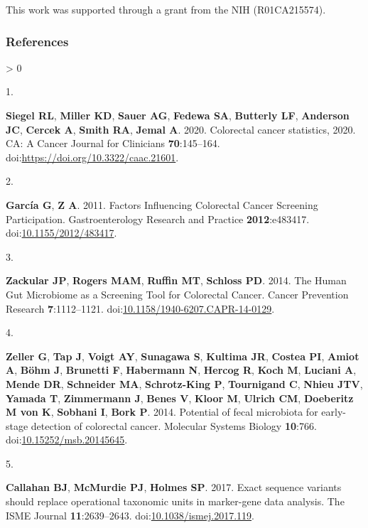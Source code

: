\documentclass[
]{article}
\newlength{\cslhangindent}
\newlength{\csllabelwidth}
\newenvironment{CSLReferences}[2] %
 {%
  \setlength{\parindent}{0pt}
  \ifodd #1 \everypar{\setlength{\hangindent}{\cslhangindent}}\ignorespaces\fi
  \ifnum #2 > 0
  \setlength{\parskip}{#2\baselineskip}
  \fi
 }%
 {}
\newcommand{\CSLLeftMargin}[1]{\parbox[t]{\csllabelwidth}{#1}}
\newcommand{\CSLRightInline}[1]{\parbox[t]{\linewidth - \csllabelwidth}{#1}\break}
\begin{document}
This work was supported through a grant from the NIH (R01CA215574).

\newpage

\hypertarget{references}{%
\subsubsection{References}\label{references}}

\hypertarget{refs}{}
\begin{CSLReferences}{0}{0}
\leavevmode\hypertarget{ref-siegel2020}{}%
\CSLLeftMargin{1. }
\CSLRightInline{\textbf{Siegel RL}, \textbf{Miller KD}, \textbf{Sauer
AG}, \textbf{Fedewa SA}, \textbf{Butterly LF}, \textbf{Anderson JC},
\textbf{Cercek A}, \textbf{Smith RA}, \textbf{Jemal A}. 2020. Colorectal
cancer statistics, 2020. CA: A Cancer Journal for Clinicians
\textbf{70}:145--164. doi:\url{https://doi.org/10.3322/caac.21601}.}

\leavevmode\hypertarget{ref-garcuxeda2011}{}%
\CSLLeftMargin{2. }
\CSLRightInline{\textbf{García G}, \textbf{Z A}. 2011. Factors
Influencing Colorectal Cancer Screening Participation. Gastroenterology
Research and Practice \textbf{2012}:e483417.
doi:\href{https://doi.org/10.1155/2012/483417}{10.1155/2012/483417}.}

\leavevmode\hypertarget{ref-zackular2014}{}%
\CSLLeftMargin{3. }
\CSLRightInline{\textbf{Zackular JP}, \textbf{Rogers MAM},
\textbf{Ruffin MT}, \textbf{Schloss PD}. 2014. The Human Gut Microbiome
as a Screening Tool for Colorectal Cancer. Cancer Prevention Research
\textbf{7}:1112--1121.
doi:\href{https://doi.org/10.1158/1940-6207.CAPR-14-0129}{10.1158/1940-6207.CAPR-14-0129}.}

\leavevmode\hypertarget{ref-zeller2014}{}%
\CSLLeftMargin{4. }
\CSLRightInline{\textbf{Zeller G}, \textbf{Tap J}, \textbf{Voigt AY},
\textbf{Sunagawa S}, \textbf{Kultima JR}, \textbf{Costea PI},
\textbf{Amiot A}, \textbf{Böhm J}, \textbf{Brunetti F},
\textbf{Habermann N}, \textbf{Hercog R}, \textbf{Koch M},
\textbf{Luciani A}, \textbf{Mende DR}, \textbf{Schneider MA},
\textbf{Schrotz-King P}, \textbf{Tournigand C}, \textbf{Nhieu JTV},
\textbf{Yamada T}, \textbf{Zimmermann J}, \textbf{Benes V},
\textbf{Kloor M}, \textbf{Ulrich CM}, \textbf{Doeberitz M von K},
\textbf{Sobhani I}, \textbf{Bork P}. 2014. Potential of fecal microbiota
for early-stage detection of colorectal cancer. Molecular Systems
Biology \textbf{10}:766.
doi:\href{https://doi.org/10.15252/msb.20145645}{10.15252/msb.20145645}.}

\leavevmode\hypertarget{ref-callahan2017}{}%
\CSLLeftMargin{5. }
\CSLRightInline{\textbf{Callahan BJ}, \textbf{McMurdie PJ},
\textbf{Holmes SP}. 2017. Exact sequence variants should replace
operational taxonomic units in marker-gene data analysis. The ISME
Journal \textbf{11}:2639--2643.
doi:\href{https://doi.org/10.1038/ismej.2017.119}{10.1038/ismej.2017.119}.}


\end{CSLReferences}
\end{document}
